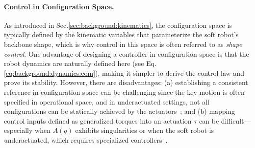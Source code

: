 \paragraph{Control in Configuration Space.}
As introduced in Sec.\ref{sec:background:kinematics}, the configuration space is typically defined by the kinematic variables that parameterize the soft robot’s backbone shape, which is why control in this space is often referred to as \emph{shape control}. One advantage of designing a controller in configuration space is that the robot dynamics are naturally defined here (see Eq.\ref{eq:background:dynamics:eom}), making it simpler to derive the control law and prove its stability. However, there are disadvantages: (a) establishing a consistent reference in configuration space can be challenging since the key motion is often specified in operational space, and in underactuated settings, not all configurations can be statically achieved by the actuators~\citep{della2025pushing}; and (b) mapping control inputs defined as generalized torques into an actuation $\tau$ can be difficult—especially when $A(q)$ exhibits singularities or when the soft robot is underactuated, which requires specialized controllers~\citep{pustina2022feedback}.


